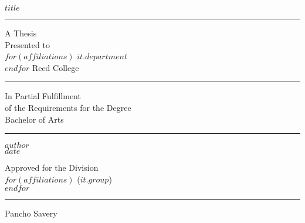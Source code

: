 %
%
%
%
%
%
%


\frontmatter
{}  %
\begin{center}
    $title$
    \vfil
    \hrule
    \vfil
    A Thesis \\
    Presented to \\
    $for(affiliations)$
    $it.department$ \\
    $endfor$
    Reed College
    \vfil
    \hrule
    \vfil
    In Partial Fulfillment \\
    of the Requirements for the Degree \\
    Bachelor of Arts
    \vfil
    \hrule
    \vfil
    $author$ \\
    $date$
    
    \cleardoublepage
    \vspace*{\fill}
    \par\vskip 6cm
    Approved for the Division \\
    $for(affiliations)$
    ($it.group$) \\
    $endfor$
    \par\vskip 2cm
    \hrule  %
    \par\vskip 3cm
    Pancho Savery  %
    \vspace*{\fill}
\end{center}

